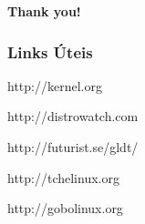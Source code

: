\documentclass[aspectratio=169,14pt]{beamer}
\begin{document}
{
\begin{frame}
    \begin{flushright}
    \huge \textbf{Thank you!}
    \end{flushright}
\end{frame}
}

\begin{frame}
    \frametitle{Links Úteis}
    http://kernel.org

    http://distrowatch.com

    http://futurist.se/gldt/

    http://tchelinux.org

    http://gobolinux.org
\end{frame}
\end{document}
